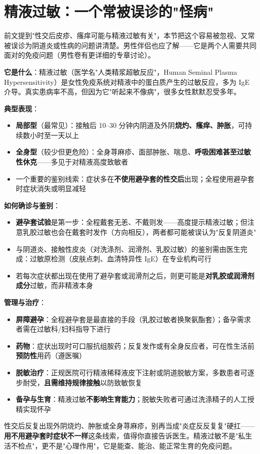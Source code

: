 \section{精液过敏：一个常被误诊的"怪病"}

前文提到"性交后皮疹、瘙痒可能与精液过敏有关"，本节把这个容易被忽视、又常被误诊为阴道炎或性病的问题讲清楚。男性伴侣也应了解——它是两个人需要共同面对的免疫问题（男性卷有更详细的专章讨论）。

\vspace{0.5em}
\noindent\textbf{它是什么}：精液过敏（医学名"人类精浆超敏反应"，Human Seminal Plasma Hypersensitivity）是女性免疫系统对精液中的蛋白质产生的过敏反应，多为 IgE 介导。真实患病率不高，但因为它"听起来不像病"，很多女性默默忍受多年。

\vspace{0.5em}
\noindent\textbf{典型表现}：

\begin{itemize}
	\item \textbf{局部型}（最常见）：接触后 10--30 分钟内阴道及外阴\textbf{烧灼、瘙痒、肿胀}，可持续数小时至一天以上
	\item \textbf{全身型}（较少但更危险）：全身荨麻疹、面部肿胀、喘息、\textbf{呼吸困难甚至过敏性休克}——多见于对精液高度致敏者
	\item 一个重要的鉴别线索：症状多在\textbf{不使用避孕套的性交后}出现；全程使用避孕套时症状消失或明显减轻
\end{itemize}

\vspace{0.5em}
\noindent\textbf{如何确诊与鉴别}：

\begin{itemize}
	\item \textbf{避孕套试验}是第一步：全程戴套无恙、不戴则发——高度提示精液过敏；但注意乳胶过敏也会在戴套时发作（方向相反），两者都可能被误认为"反复阴道炎"
	\item 与阴道炎、接触性皮炎（对洗涤剂、润滑剂、乳胶过敏）的鉴别需由医生完成：过敏原检测（皮肤点刺、血清特异性 IgE）在专业机构可行
	\item 若每次症状都出现在使用了避孕套或润滑剂之后，则更可能是\textbf{对乳胶或润滑剂成分}过敏，而非精液本身
\end{itemize}

\vspace{0.5em}
\noindent\textbf{管理与治疗}：

\begin{itemize}
	\item \textbf{屏障避孕}：全程避孕套是最直接的手段（乳胶过敏者换聚氨酯套）；备孕需求者需在过敏科/妇科指导下进行
	\item \textbf{药物}：症状出现时可口服抗组胺药；反复发作或有全身反应者，可在性生活前\textbf{预防性}用药（遵医嘱）
	\item \textbf{脱敏治疗}：正规医院可行精液稀释液皮下注射或阴道脱敏方案，多数患者可逐步耐受，\textbf{且需维持规律接触}以防致敏恢复
	\item \textbf{备孕与生育}：精液过敏\textbf{不影响生育能力}；脱敏失败者可通过洗涤精子的人工授精实现怀孕
\end{itemize}

\begin{tcolorbox}[colback=pink!5!white,colframe=red!50!black,title=贴心小叮咛]
性交后反复出现外阴烧灼、肿胀或全身荨麻疹，别再当成"炎症反反复复"硬扛——\textbf{用不用避孕套时症状不一样}这条线索，值得你直接告诉医生。精液过敏不是"私生活不检点"，更不是"心理作用"，它是能查、能治、能正常生育的免疫问题。
\end{tcolorbox}

